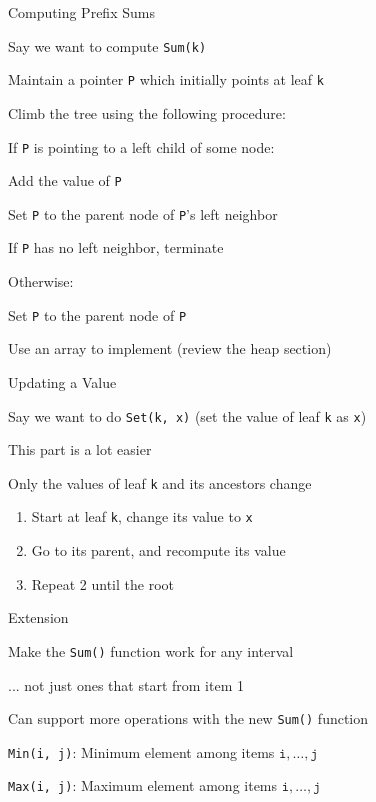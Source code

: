 \documentclass[13pt,onlymath]{beamer}
\begin{document}
\begin{frame}[fragile]{Computing Prefix Sums}
\BIT
\item Say we want to compute \verb,Sum(k),
\item Maintain a pointer \verb,P, which initially points at leaf \verb,k,
\item Climb the tree using the following procedure:
\BIT
\item If \verb,P, is pointing to a left child of some node:
\BIT
\item Add the value of \verb,P,
\item Set \verb,P, to the parent node of \verb,P,'s left neighbor
\item If \verb,P, has no left neighbor, terminate
\EIT
\item Otherwise:
\BIT
\item Set \verb,P, to the parent node of \verb,P,
\EIT
\EIT
\item Use an array to implement (review the heap section)
\EIT
\end{frame}

\begin{frame}[fragile]{Updating a Value}
\BIT
\item Say we want to do \verb.Set(k, x). (set the value of leaf \verb,k, as \verb,x,)
\item This part is a lot easier
\item Only the values of leaf \verb,k, and its ancestors change
\EIT
\begin{enumerate}
\item Start at leaf \verb,k,, change its value to \verb,x,
\item Go to its parent, and recompute its value
\item Repeat 2 until the root
\end{enumerate}
\end{frame}

\begin{frame}[fragile]{Extension}
\BIT
\item Make the \verb,Sum(), function work for any interval
\BIT
\item ... not just ones that start from item 1
\EIT
\vfill
\item Can support more operations with the new \verb,Sum(), function
\BIT
\item \verb.Min(i, j).: Minimum element among items $\mathtt{i}, \ldots, \mathtt{j}$
\item \verb.Max(i, j).: Maximum element among items $\mathtt{i}, \ldots, \mathtt{j}$
\EIT
\EIT
\end{frame}
\end{document}
